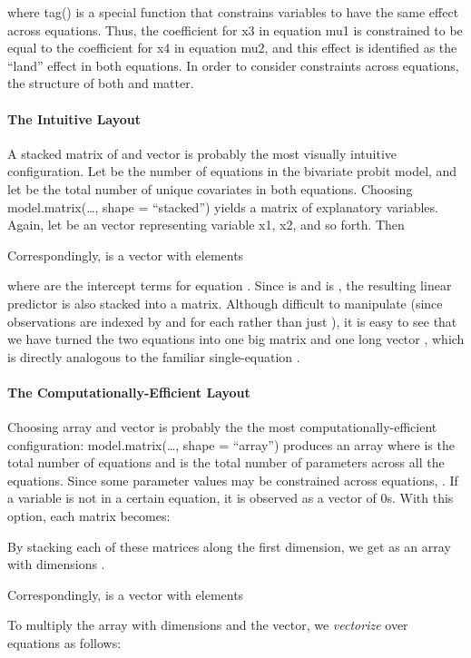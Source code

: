\documentclass[letterpaper,10pt,english]{sphinxmanual}
\begin{document}
where tag() is a special function that constrains variables to have the
same effect across equations. Thus, the coefficient for x3 in equation
mu1 is constrained to be equal to the coefficient for x4 in equation
mu2, and this effect is identified as the “land” effect in both
equations. In order to consider constraints across equations, the
structure of both  and  matter.


\paragraph{The Intuitive Layout}
\label{docs/dev_guide:the-intuitive-layout}
A stacked matrix of  and vector  is probably the
most visually intuitive configuration. Let  be the number
of equations in the bivariate probit model, and let  be the
total number of unique covariates in both equations. Choosing
model.matrix(…, shape = “stacked”) yields a  matrix of explanatory variables. Again, let 
be an  vector representing variable x1, 
x2, and so forth. Then

Correspondingly,  is a vector with elements

where  are the intercept terms for equation
. Since  is  and  is
, the resulting linear predictor  is
also stacked into a  matrix. Although difficult to manipulate (since observations are
indexed by  and  for each 
rather than just ), it is easy to see that we have turned the
two equations into one big  matrix and one long vector
, which is directly analogous to the familiar
single-equation .


\paragraph{The Computationally-Efficient Layout}
\label{docs/dev_guide:the-computationally-efficient-layout}
Choosing array  and vector  is probably the the
most computationally-efficient configuration: model.matrix(…, shape =
“array”) produces an  array where  is the total number of equations and
 is the total number of parameters across all the equations.
Since some parameter values may be constrained across equations,
. If a variable is not in a certain equation, it is
observed as a vector of 0s. With this option, each
  matrix becomes:

By stacking each of these  matrices along the first
dimension, we get  as an array with dimensions
.

Correspondingly,  is a vector with elements

To multiply the  array with dimensions
 and the  
vector, we \emph{vectorize} over equations as follows:
\end{document}
